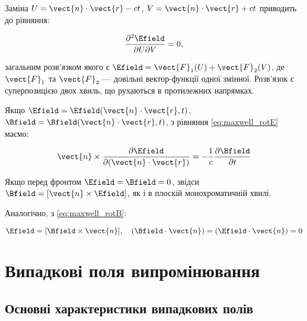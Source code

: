 Заміна \(U = \vect{n} \cdot \vect{r} - ct\), \(V = \vect{n} \cdot \vect{r} + ct\) приводить до рівняння:

\begin{equation*}
\frac{\partial^2 \Efield}{\partial U \partial V} = 0,
\end{equation*}

загальним розв’язком якого є \(\Efield = \vect{F}_1(U) + \vect{F}_2(V)\), де \(\vect{F}_1\) та \(\vect{F}_2\) --- довільні вектор-функції одної
змінної. Розв’язок є суперпозицією двох хвиль, що рухаються в протилежних напрямках.

Якщо \(\Efield = \Efield(\vect{n} \cdot \vect{r}, t)\), \(\Bfield = \Bfield(\vect{n} \cdot \vect{r}, t)\), з рівняння \eqref{eq:maxwell_rotE} маємо:

\begin{equation*}
\vect{n} \times \frac{\partial \Efield}{\partial (\vect{n} \cdot \vect{r})} = -\frac{1}{c} \frac{\partial \Bfield}{\partial t}
\end{equation*}

Якщо перед фронтом \(\Efield = \Bfield = 0\), звідси \(\Bfield = [\vect{n} \times \Efield]\), як і в плоскій монохроматичній хвилі.

Аналогічно, з \eqref{eq:maxwell_rotB}:

\begin{equation*}
\Efield = [\Bfield \times \vect{n}], \quad (\Bfield \cdot \vect{n}) = (\Efield \cdot \vect{n}) = 0
\end{equation*}


\section{Випадкові поля випромінювання}

\subsection*{Основні характеристики випадкових полів}

